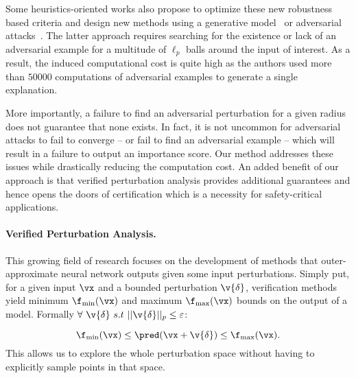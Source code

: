 Some heuristics-oriented works also propose to optimize these new robustness based criteria and design new methods using a generative model~\cite{o2020generative} or adversarial attacks~\cite{hsieh2020evaluations}.
The latter approach requires searching for the existence or lack of an adversarial example for a multitude of $\ell_p$ balls around the input of interest. As a result, the induced computational cost is quite high as the authors used more than $50000$  computations of adversarial examples to generate a single explanation. 

More importantly, a failure to find an adversarial perturbation for a given radius does not guarantee that none exists. In fact, it is not uncommon for adversarial attacks to fail to converge --  or fail to find an adversarial example -- which will result in a failure to output an importance score.
Our method addresses these issues while drastically reducing the computation cost.
An added benefit of our approach is that verified perturbation analysis provides additional guarantees and hence opens the doors of certification which is a necessity for safety-critical applications.

\paragraph{Verified Perturbation Analysis.} This growing field of research focuses on the development of methods that outer-approximate neural network outputs given some input perturbations. 
Simply put, for a given input $\vx$ and a bounded perturbation $\v{\delta}$, verification methods yield minimum $\lowerf(\vx)$ and maximum $\upperf(\vx)$ bounds on the output of a model. Formally $\forall~ \v{\delta} ~s.t~ ||\v{\delta}||_p \leq \varepsilon$:

$$
\lowerf(\vx) \leq \pred(\vx + \v{\delta}) \leq \upperf(\vx). 
$$
This allows us to explore the whole perturbation space without having to explicitly sample points in that space.

